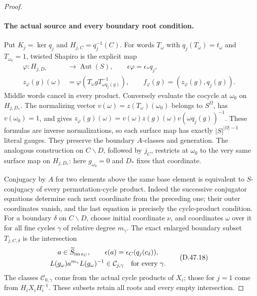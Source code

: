 \begin{proof}
\paragraph{The actual source and every boundary root condition.}
Put \(K_j=\ker q_j\) and \(H_{j,C}=q_j^{-1}(C)\).
For words \(T_\omega\) with \(q_j(T_\omega)=t_\omega\)
and \(T_{\omega_0}=1\), twisted Shapiro is the explicit map
\[
 \begin{split}
 \varphi:H_{j,D_*}&\longrightarrow\operatorname{Aut}(S),
                      \qquad \epsilon\varphi=\epsilon_*q_j,\\
 z_\varphi(g)(\omega)
       &=\varphi(T_\omega gT_{\omega q_j(g)}^{-1}),\qquad
 f_\varphi(g)=(z_\varphi(g),q_j(g)).
 \end{split}
 \tag{D.47.17}
\]
Middle words cancel in every product. Conversely evaluate
the cocycle at \(\omega_0\) on \(H_{j,D_*}\).
The normalizing vector
\(v(\omega)=z(T_\omega)(\omega_0)\) belongs to \(S^\Omega\),
has \(v(\omega_0)=1\), and gives
\(z_\varphi(g)(\omega)=
v(\omega)z(g)(\omega)v(\omega q_j(g))^{-1}\).
These formulas are inverse normalizations, so each surface
map has exactly \(|S|^{|\Omega|-1}\) literal gauges.
They preserve the boundary \(A\)-classes and generation.
The analogous construction on \(C\backslash D\), followed
by \(j_C\), restricts at \(\omega_0\) to the very same
surface map on \(H_{j,D_*}\): here \(g_{\omega_0}=0\)
and \(D_*\) fixes that coordinate.

Conjugacy by \(A\) for two elements above the same base
element is equivalent to \(S\)-conjugacy of every
permutation-cycle product. Indeed the successive conjugator
equations determine each next coordinate from the preceding
one; their outer coordinates vanish, and the last equation
is precisely the cycle-product condition.
For a boundary \(\delta\) on \(C\backslash D\), choose
initial coordinate \(\nu\), and coordinates \(\omega\)
over it for all fine cycles \(\gamma\) of relative degree
\(m_\gamma\). The exact enlarged boundary subset
\(T_{j,C,\delta}\) is the intersection
\[
 \begin{gathered}
 a\in\widetilde S_{\operatorname{im}\epsilon_C},\qquad
 \epsilon(a)=\epsilon_C(q_j(c_\delta)),\\
 L(g_\omega)a^{m_\gamma}L(g_\omega)^{-1}
                     \in\mathcal C_{j,\gamma}
                         \quad\hbox{for every }\gamma.
 \end{gathered}
 \tag{D.47.18}
\]
The classes \(\mathcal C_{0,\gamma}\) come from the
actual cycle products of \(X_i\); those for \(j=1\)
come from \(H_iX_iH_i^{-1}\). These subsets retain all
roots and every empty intersection.


\end{proof}
